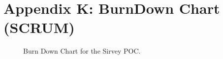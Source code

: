\documentclass[12pt]{witseiepaper}
\begin{document}
\newpage


\newpage


\newpage
\section{Appendix K: BurnDown Chart (SCRUM)}
\begin{figure}[H]
	\caption{Burn Down Chart for the Sirvey POC.} 
	\label{fig:BurnDown}
\end{figure}
\end{document}
